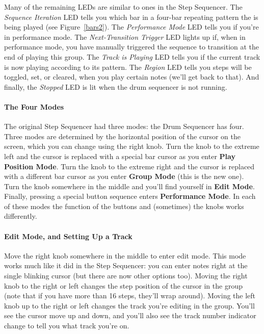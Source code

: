 \documentclass{article}
\begin{document}
Many of the remaining LEDs are similar to ones in the Step Sequencer.  The {\it Sequence Iteration} LED tells you which bar in a four-bar repeating pattern the is being played (see Figure~\ref{bars2}).  The {\it Performance Mode} LED tells you if you're in performance mode.  The {\it Next-Transition Trigger} LED lights up if, when in performance mode, you have manually triggered the sequence to transition at the end of playing this group.  The {\it Track is Playing} LED tells you if the current track is now playing according to its pattern.  The {\it Region} LED tells you steps will be toggled, set, or cleared, when you play certain notes (we'll get back to that). And finally, the {\it Stopped} LED is lit when the drum sequencer is not running.

\paragraph{The Four Modes} The original Step Sequencer had three modes: the Drum Sequencer has four. Three modes are determined by the horizontal position of the cursor on the screen, which you can change using the right knob.  Turn the knob to the extreme left and the cursor is replaced with a special bar cursor as you enter {\bf Play Position Mode}.  Turn the knob to the extreme right and the cursor is replaced with a different bar cursor as you enter {\bf Group Mode} (this is the new one).  Turn the knob somewhere in the middle and you'll find yourself in {\bf Edit Mode}.  Finally, pressing a special button sequence enters {\bf Performance Mode}.  In each of these modes the function of the buttons and (sometimes) the knobs works differently. 

\paragraph{Edit Mode, and Setting Up a Track} Move the right knob somewhere in the middle to enter edit mode.  This mode works much like it did in the Step Sequencer: you can enter notes right at the single blinking cursor (but there are now other options too).  Moving the right knob to the right or left changes the step position of the cursor in the group (note that if you have more than 16 steps, they'll wrap around).  Moving the left knob up to the right or left changes the track you're editing in the group.  You'll see the cursor move up and down, and you'll also see the track number indicator change to tell you what track you're on.
\end{document}
